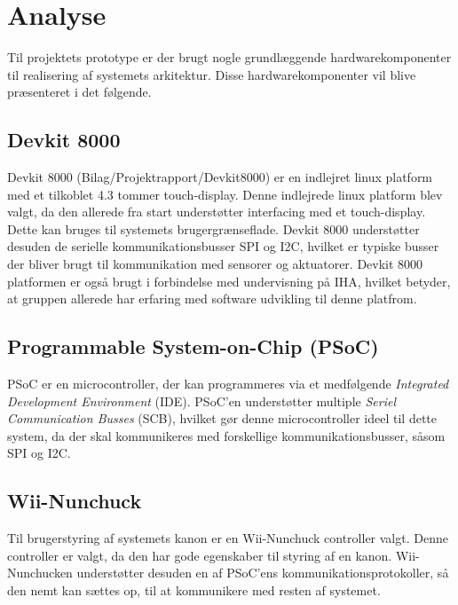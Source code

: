 \chapter{Analyse}
\label{afsnit:analyse}
Til projektets prototype er der brugt nogle grundlæggende hardwarekomponenter til realisering af systemets arkitektur. Disse hardwarekomponenter vil blive præsenteret i det følgende.

\section{Devkit 8000}
Devkit 8000 (Bilag/Projektrapport/Devkit8000) er en indlejret linux platform med et tilkoblet 4.3 tommer touch-display. Denne indlejrede linux platform blev valgt, da den allerede fra start understøtter interfacing med et touch-display. Dette kan bruges til systemets brugergrænseflade. Devkit 8000 understøtter desuden de serielle kommunikationsbusser SPI og I2C, hvilket er typiske busser der bliver brugt til kommunikation med sensorer og aktuatorer. \newline 
\noindent Devkit 8000 platformen er også brugt i forbindelse med undervisning på IHA, hvilket betyder, at gruppen allerede har erfaring med software udvikling til denne platfrom.

\section{Programmable System-on-Chip (PSoC)}
PSoC \cite{psoc} er en microcontroller, der kan programmeres via et medfølgende \textit{Integrated Development Environment} (IDE). PSoC'en understøtter multiple \textit{Seriel Communication Busses} (SCB), hvilket gør denne microcontroller ideel til dette system, da der skal kommunikeres med forskellige kommunikationsbusser, såsom SPI og I2C.

\section{Wii-Nunchuck}
Til brugerstyring af systemets kanon er en Wii-Nunchuck controller \cite{nunchuck} valgt. Denne controller er valgt, da den har gode egenskaber til styring af en kanon. Wii-Nunchucken understøtter desuden en af PSoC'ens kommunikationsprotokoller, så den nemt kan sættes op, til at kommunikere med resten af systemet.

